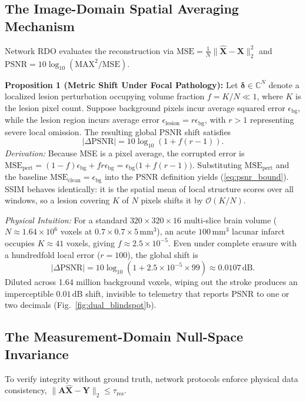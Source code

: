 \documentclass[conference]{IEEEtran}
\begin{document}
\subsection{The Image-Domain Spatial Averaging Mechanism}
Network RDO evaluates the reconstruction via $\text{MSE} = \frac{1}{N}\|\hat{\mathbf{X}} - \mathbf{X}\|_2^2$ and $\text{PSNR} = 10\log_{10}(\text{MAX}^2/\text{MSE})$.

\textbf{Proposition 1 (Metric Shift Under Focal Pathology):} Let $\boldsymbol{\delta} \in \mathbb{C}^N$ denote a localized lesion perturbation occupying volume fraction $f = K/N \ll 1$, where $K$ is the lesion pixel count. Suppose background pixels incur average squared error $\epsilon_{\text{bg}}$, while the lesion region incurs average error $\epsilon_{\text{lesion}} = r \epsilon_{\text{bg}}$, with $r > 1$ representing severe local omission. The resulting global PSNR shift satisfies
\begin{equation}
|\Delta\text{PSNR}| = 10\log_{10}\left(1 + f(r - 1)\right).
\label{eq:psnr_bound}
\end{equation}
\textit{Derivation:} Because MSE is a pixel average, the corrupted error is $\text{MSE}_{\text{pert}} = (1-f)\epsilon_{\text{bg}} + fr\epsilon_{\text{bg}} = \epsilon_{\text{bg}}\big(1 + f(r-1)\big)$. Substituting $\text{MSE}_{\text{pert}}$ and the baseline $\text{MSE}_{\text{clean}} = \epsilon_{\text{bg}}$ into the PSNR definition yields (\ref{eq:psnr_bound}). SSIM behaves identically: it is the spatial mean of local structure scores over all windows, so a lesion covering $K$ of $N$ pixels shifts it by $\mathcal{O}(K/N)$.

\textit{Physical Intuition:} For a standard $320 \times 320 \times 16$ multi-slice brain volume ($N \approx 1.64 \times 10^6$ voxels at $0.7 \times 0.7 \times 5\,\text{mm}^3$), an acute $100\,\text{mm}^3$ lacunar infarct occupies $K \approx 41$ voxels, giving $f \approx 2.5 \times 10^{-5}$. Even under complete erasure with a hundredfold local error ($r = 100$), the global shift is
\begin{equation*}
|\Delta\text{PSNR}| = 10\log_{10}(1 + 2.5\times 10^{-5} \times 99) \approx 0.0107\,\text{dB}.
\end{equation*}
Diluted across 1.64 million background voxels, wiping out the stroke produces an imperceptible $0.01\,\text{dB}$ shift, invisible to telemetry that reports PSNR to one or two decimals (Fig.~\ref{fig:dual_blindspot}b).

\subsection{The Measurement-Domain Null-Space Invariance}
To verify integrity without ground truth, network protocols enforce physical data consistency, $\|\mathbf{A}\hat{\mathbf{X}} - \mathbf{Y}\|_2 \le \tau_{\text{res}}$.
\end{document}
